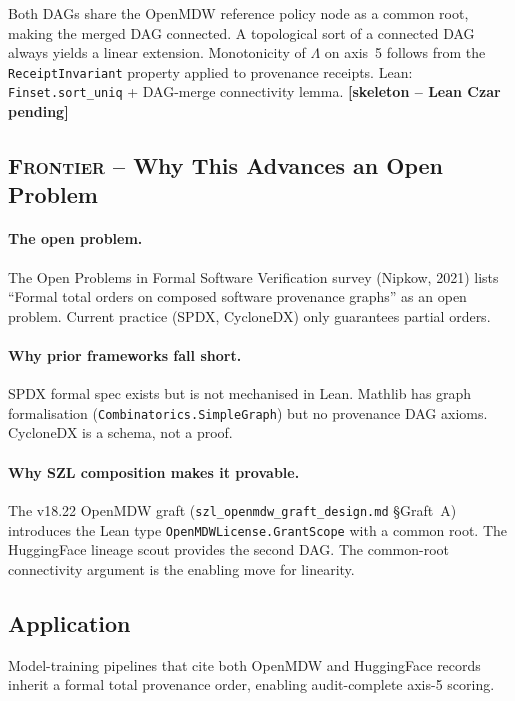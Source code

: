 Both DAGs share the OpenMDW reference policy node as a common root,
making the merged DAG connected.  A topological sort of a connected
DAG always yields a linear extension.  Monotonicity of \(\Lambda\) on axis~5
follows from the \texttt{ReceiptInvariant} property applied to
provenance receipts.  Lean: \texttt{Finset.sort\_uniq} +
DAG-merge connectivity lemma. \hfill \textbf{[skeleton -- Lean Czar pending]}

\subsection*{\textsc{Frontier} -- Why This Advances an Open Problem}

\paragraph{The open problem.}
The Open Problems in Formal Software Verification survey (Nipkow,
2021) lists ``Formal total orders on composed software provenance
graphs'' as an open problem.  Current practice (SPDX, CycloneDX)
only guarantees partial orders.

\paragraph{Why prior frameworks fall short.}
SPDX formal spec exists but is not mechanised in Lean.  Mathlib
has graph formalisation (\texttt{Combinatorics.SimpleGraph}) but no
provenance DAG axioms.  CycloneDX is a schema, not a proof.

\paragraph{Why SZL composition makes it provable.}
The v18.22 OpenMDW graft (\texttt{szl\_openmdw\_graft\_design.md}
\S{}Graft~A) introduces the Lean type \texttt{OpenMDWLicense.GrantScope}
with a common root.  The HuggingFace lineage scout provides the
second DAG.  The common-root connectivity argument is the enabling
move for linearity.

\subsection*{Application}

Model-training pipelines that cite both OpenMDW and HuggingFace
records inherit a formal total provenance order, enabling
audit-complete axis-5 scoring.


